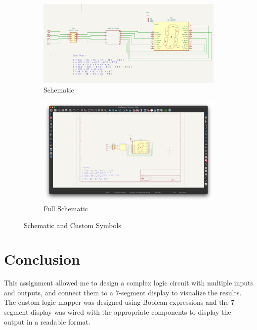\documentclass[a4paper,10pt]{article}
\begin{document}
\begin{figure}[h!]
    \begin{subfigure}[b]{0.45\textwidth}
        \centering
        \includegraphics[width=\textwidth]{img/schDiagram.png}
        \caption{Schematic}
        \label{fig:custom_symbol1}
    \end{subfigure}
    \hfill
    \begin{subfigure}[b]{0.45\textwidth}
        \centering
        \includegraphics[width=\textwidth]{img/FullSch.png}
        \caption{Full Schematic}
        \label{fig:custom_symbol2}
    \end{subfigure}
    
    \caption{Schematic and Custom Symbols}
    \label{fig:all_images}
\end{figure}

\section*{Conclusion}
This assignment allowed me to design a complex logic circuit with multiple inputs and outputs, and connect them to a 7-segment display to visualize the results. The custom logic mapper was designed using Boolean expressions and the 7-segment display was wired with the appropriate components to display the output in a readable format.
\end{document}
